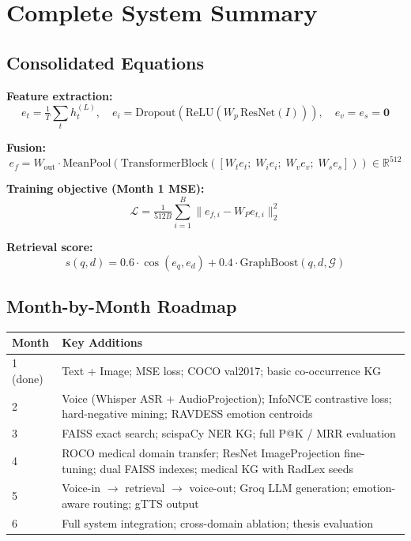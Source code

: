 \documentclass[12pt, a4paper]{article}
\theoremstyle{definition}
\theoremstyle{plain}
\theoremstyle{remark}
\begin{document}
\section{Complete System Summary}
\label{sec:summary}

\subsection{Consolidated Equations}

\textbf{Feature extraction:}
\[
  e_t = \tfrac{1}{T}\textstyle\sum_{t} h_t^{(L)},\quad
  e_i = \mathrm{Dropout}(\mathrm{ReLU}(W_p\,\mathrm{ResNet}(I))),\quad
  e_v = e_s = \mathbf{0}
\]

\textbf{Fusion:}
\[
  e_f = W_{\mathrm{out}}\cdot\mathrm{MeanPool}\!\left(
  \mathrm{TransformerBlock}\!\left(
  [W_t e_t;\;W_i e_i;\;W_v e_v;\;W_s e_s]
  \right)\right)\in\mathbb{R}^{512}
\]

\textbf{Training objective (Month 1 MSE):}
\[
  \mathcal{L} = \tfrac{1}{512B}
  \textstyle\sum_{i=1}^{B}\|e_{f,i} - W_P e_{t,i}\|_2^2
\]

\textbf{Retrieval score:}
\[
  s(q, d) = 0.6\cdot\cos(e_q, e_d) + 0.4\cdot\mathrm{GraphBoost}(q, d, \mathcal{G})
\]

\subsection{Month-by-Month Roadmap}

\begin{center}
\renewcommand{\arraystretch}{1.2}
\begin{tabular}{@{}lp{11cm}@{}}
\toprule
\textbf{Month} & \textbf{Key Additions} \\
\midrule
1 (done)   & Text + Image; MSE loss; COCO val2017; basic co-occurrence KG \\
2          & Voice (Whisper ASR + AudioProjection); InfoNCE contrastive loss;
             hard-negative mining; RAVDESS emotion centroids \\
3          & FAISS exact search; scispaCy NER KG; full P@K / MRR evaluation \\
4          & ROCO medical domain transfer; ResNet ImageProjection fine-tuning;
             dual FAISS indexes; medical KG with RadLex seeds \\
5          & Voice-in $\to$ retrieval $\to$ voice-out; Groq LLM generation;
             emotion-aware routing; gTTS output \\
6          & Full system integration; cross-domain ablation; thesis evaluation \\
\bottomrule
\end{tabular}
\end{center}
\end{document}
